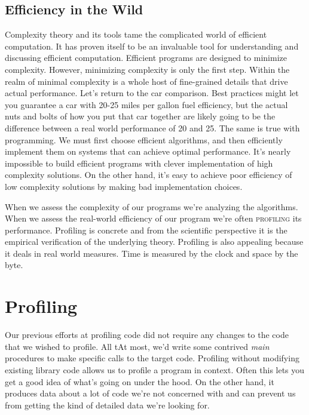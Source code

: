 \documentclass[]{tufte-handout}
\begin{document}
\subsection{Efficiency in the Wild}

Complexity theory and its tools tame the complicated world of efficient computation. It has proven itself to be an invaluable tool for understanding and discussing efficient computation. Efficient programs are designed to minimize complexity.  However, minimizing complexity is only the first step.  Within the realm of minimal complexity is a whole host of fine-grained details that drive actual performance. Let's return to the car comparison. Best practices might let you guarantee a car with 20-25 miles per gallon fuel efficiency, but the actual nuts and bolts of how you put that car together are likely going to be the difference between a real world performance of 20 and 25. The same is true with programming. We must first choose efficient algorithms, and then efficiently implement them on systems that can achieve optimal performance. It's nearly impossible to build efficient programs with clever implementation of high complexity solutions. On the other hand, it's easy to achieve poor efficiency of low complexity solutions by making bad implementation choices. 

When we assess the complexity of our programs we're analyzing the algorithms. When we assess the real-world efficiency of our program we're often \textsc{profiling} its performance. Profiling is concrete and from the scientific perspective it is the empirical verification of the underlying theory.   Profiling is also appealing because it deals in real world measures. Time is measured by the clock and space by the byte. 



\section{Profiling}

Our previous efforts at profiling code did not require any changes to the code that we wished to profile. All tAt most, we'd write some contrived \textit{main} procedures to make specific calls to the target code.  Profiling without modifying existing library code allows us to profile a program in context. Often this lets you get a good idea of what's going on under the hood. On the other hand, it produces data about a lot of code we're not concerned with and can prevent us from getting the kind of detailed data we're looking for.
\end{document}
